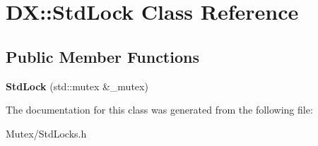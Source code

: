 \hypertarget{class_d_x_1_1_std_lock}{\section{D\-X\-:\-:Std\-Lock Class Reference}
\label{class_d_x_1_1_std_lock}
}
\subsection*{Public Member Functions}
\begin{DoxyCompactItemize}
\item 
\hypertarget{class_d_x_1_1_std_lock_a0c37e2db9c2f36346c615e78509ad206}{{\bfseries Std\-Lock} (std\-::mutex \&\-\_\-mutex)}\label{class_d_x_1_1_std_lock_a0c37e2db9c2f36346c615e78509ad206}

\end{DoxyCompactItemize}


The documentation for this class was generated from the following file\-:\begin{DoxyCompactItemize}
\item 
Mutex/Std\-Locks.\-h\end{DoxyCompactItemize}
